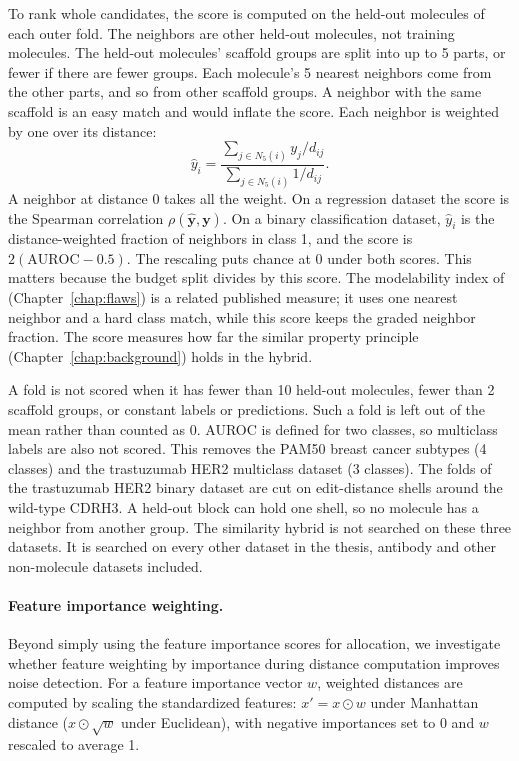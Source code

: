 To rank whole candidates, the score is computed on the held-out molecules of each outer fold. The neighbors are other held-out molecules, not training molecules. The held-out molecules' scaffold groups are split into up to 5 parts, or fewer if there are fewer groups. Each molecule's 5 nearest neighbors come from the other parts, and so from other scaffold groups. A neighbor with the same scaffold is an easy match and would inflate the score. Each neighbor is weighted by one over its distance:
\begin{equation}
\hat{y}_i = \frac{\sum_{j\in N_5(i)} y_j / d_{ij}}{\sum_{j\in N_5(i)} 1/d_{ij}}.
\end{equation}
A neighbor at distance 0 takes all the weight. On a regression dataset the score is the Spearman correlation $\rho(\hat{\mathbf{y}}, \mathbf{y})$. On a binary classification dataset, $\hat{y}_i$ is the distance-weighted fraction of neighbors in class 1, and the score is $2(\mathrm{AUROC} - 0.5)$. The rescaling puts chance at 0 under both scores. This matters because the budget split divides by this score. The modelability index of \citet{Golbraikh2014} (Chapter~\ref{chap:flaws}) is a related published measure; it uses one nearest neighbor and a hard class match, while this score keeps the graded neighbor fraction. The score measures how far the similar property principle (Chapter~\ref{chap:background}) holds in the hybrid.

A fold is not scored when it has fewer than 10 held-out molecules, fewer than 2 scaffold groups, or constant labels or predictions. Such a fold is left out of the mean rather than counted as 0. AUROC is defined for two classes, so multiclass labels are also not scored. This removes the PAM50 breast cancer subtypes (4 classes) and the trastuzumab HER2 multiclass dataset (3 classes). The folds of the trastuzumab HER2 binary dataset are cut on edit-distance shells around the wild-type CDRH3. A held-out block can hold one shell, so no molecule has a neighbor from another group. The similarity hybrid is not searched on these three datasets. It is searched on every other dataset in the thesis, antibody and other non-molecule datasets included.


\paragraph{Feature importance weighting.}

Beyond simply using the feature importance scores for allocation, we investigate whether feature weighting by importance during distance computation improves noise detection. For a feature importance vector $w$, weighted distances are computed by scaling the standardized features: $x' = x \odot w$ under Manhattan distance ($x \odot \sqrt{w}$ under Euclidean), with negative importances set to 0 and $w$ rescaled to average 1. 


